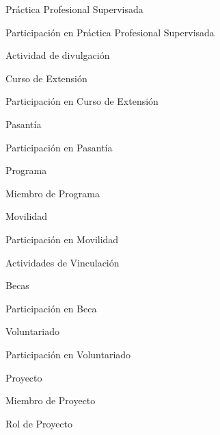     \item Práctica Profesional Supervisada
    \item Participación en Práctica Profesional Supervisada
    \item Actividad de divulgación
    \item Curso de Extensión
    \item Participación en Curso de Extensión
    \item Pasantía
    \item Participación en Pasantía
    \item Programa
    \item Miembro de Programa
    \item Movilidad
    \item Participación en Movilidad
    \item Actividades de Vinculación
    \item Becas
    \item Participación en Beca
    \item Voluntariado
    \item Participación en Voluntariado
    \item Proyecto
    \item Miembro de Proyecto
    \item Rol de Proyecto
